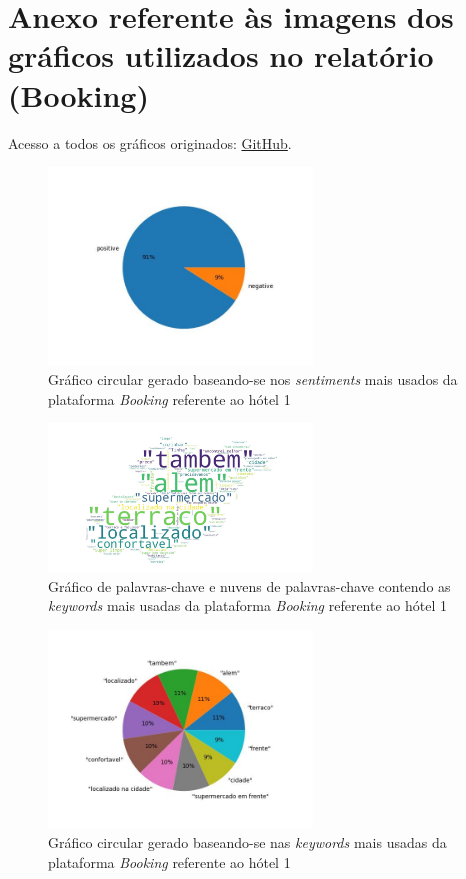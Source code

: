 \chapter{Anexo referente às imagens dos gráficos utilizados no relatório (Booking)}

Acesso a todos os gráficos originados: \href{https://github.com/CatKinKitKat/pi2021/tree/master/projecto/datascience/graphs/booking/hotels}{GitHub}.

\label{an1}
\begin{figure}[!htb]
\centering
\includegraphics[width=7cm]{figuras/Booking/hotel1_sentiments.jpeg}
\caption{Gráfico circular gerado baseando-se nos \textit{sentiments} mais usados da plataforma \textit{Booking} referente ao hótel 1}
\label{fig:exemplofig}
\end{figure}

\begin{figure}[!htb]
\centering
\includegraphics[width=7cm]{figuras/Booking/hotel1_keywordcloud.jpeg}
\caption{Gráfico de palavras-chave e nuvens de palavras-chave contendo as \textit{keywords} mais usadas da plataforma \textit{Booking} referente ao hótel 1}
\label{fig:exemplofig}
\end{figure}

\begin{figure}[!htb]
\centering
\includegraphics[width=7cm]{figuras/Booking/hotel1_keywords.jpeg}
\caption{Gráfico circular gerado baseando-se nas \textit{keywords} mais usadas da plataforma \textit{Booking} referente ao hótel 1}
\label{fig:exemplofig}
\end{figure}

